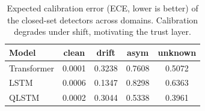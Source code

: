 \begin{table}[t]
\centering
\caption{Expected calibration error (ECE, lower is better) of the closed-set detectors across domains. Calibration degrades under shift, motivating the trust layer.}
\label{tab:calibration}
\begin{tabular}{lcccc}
\toprule
Model & clean & drift & asym & unknown \\
\midrule
Transformer & 0.0001 & 0.3238 & 0.7608 & 0.5072 \\
LSTM & 0.0006 & 0.1347 & 0.8298 & 0.6363 \\
QLSTM & 0.0002 & 0.3044 & 0.5338 & 0.3961 \\
\bottomrule
\end{tabular}
\end{table}
